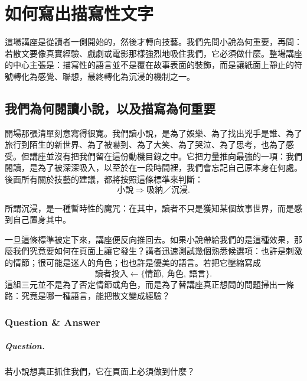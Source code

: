 \chapter{如何寫出描寫性文字}

這場講座是從讀者一側開始的，然後才轉向技藝。我們先問小說為何重要，再問：若散文要像真實經驗、戲劇或電影那樣強烈地吸住我們，它必須做什麼。整場講座的中心主張是：描寫性的語言並不是覆在故事表面的裝飾，而是讓紙面上靜止的符號轉化為感覺、聯想，最終轉化為沉浸的機制之一。

\section{我們為何閱讀小說，以及描寫為何重要}

開場那張清單刻意寫得很寬。我們讀小說，是為了娛樂、為了找出兇手是誰、為了旅行到陌生的新世界、為了被嚇到、為了大笑、為了哭泣、為了思考，也為了感受。但講座並沒有把我們留在這份動機目錄之中。它把力量推向最強的一項：我們閱讀，是為了被深深吸入，以至於在一段時間裡，我們會忘記自己原本身在何處。後面所有關於技藝的建議，都將按照這條標準來判斷：
\begin{equation}
\text{小說} \Rightarrow \text{吸納／沉浸}.
\end{equation}

\begin{definition}
所謂沉浸，是一種暫時性的魔咒：在其中，讀者不只是獲知某個故事世界，而是感到自己置身其中。
\end{definition}

一旦這條標準被定下來，講座便反向推回去。如果小說帶給我們的是這種效果，那麼我們究竟要如何在頁面上讓它發生？講者迅速測試幾個熟悉候選項：也許是刺激的情節；很可能是迷人的角色；也也許是優美的語言。若把它壓縮寫成
\begin{equation}
\text{讀者投入} \leftarrow \{\text{情節},\ \text{角色},\ \text{語言}\}.
\end{equation}
這組三元並不是為了否定情節或角色，而是為了替講座真正想問的問題掃出一條路：究竟是哪一種語言，能把散文變成經驗？

\subsection{Question \& Answer}

\paragraph{Question.} 若小說想真正抓住我們，它在頁面上必須做到什麼？

